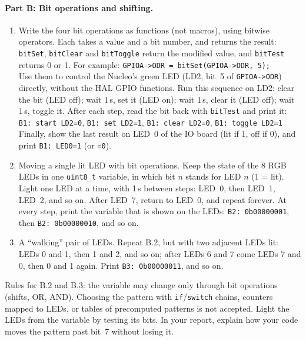 \documentclass[11pt,a4paper]{article}
\begin{document}
\paragraph{Part B: Bit operations and shifting.}
\begin{enumerate}[label=B.\arabic*, leftmargin=2.2em]
  \item Write the four bit operations as functions (not macros), using bitwise operators. Each takes a value and a bit
        number, and returns the result: \texttt{bitSet}, \texttt{bitClear} and \texttt{bitToggle} return the modified
        value, and \texttt{bitTest} returns 0 or 1. For example: \texttt{GPIOA->ODR = bitSet(GPIOA->ODR, 5);}\\
        Use them to control the Nucleo's green LED (LD2, bit~5 of \texttt{GPIOA->ODR}) directly, without the HAL GPIO
        functions. Run this sequence on LD2: clear the bit (LED off); wait 1\,s, set it (LED on); wait 1\,s, clear it
        (LED off); wait 1\,s, toggle it. After each step, read the bit back with \texttt{bitTest} and print it:\\
        \texttt{B1: start LD2=0}, \texttt{B1: set LD2=1}, \texttt{B1: clear LD2=0}, \texttt{B1: toggle LD2=1}\\
        Finally, show the last result on LED~0 of the IO board (lit if 1, off if 0), and print \texttt{B1: LED0=1}
        (or \texttt{=0}).
  \item Moving a single lit LED with bit operations. Keep the state of the 8 RGB LEDs in one \texttt{uint8\_t}
        variable, in which bit $n$ stands for LED $n$ (1 = lit). Light one LED at a time, with 1\,s between steps:
        LED~0, then LED~1, LED~2, and so on. After LED~7, return to LED~0, and repeat forever. At every step, print
        the variable that is shown on the LEDs: \texttt{B2: 0b00000001}, then \texttt{B2: 0b00000010}, and so on.
  \item A ``walking'' pair of LEDs. Repeat B.2, but with two adjacent LEDs lit: LEDs 0 and 1, then 1 and 2, and so
        on; after LEDs 6 and 7 come LEDs 7 and 0, then 0 and 1 again. Print \texttt{B3: 0b00000011}, and so on.
\end{enumerate}
\smallskip\noindent Rules for B.2 and B.3: the variable may change only through bit operations (shifts, OR, AND).
Choosing the pattern with \texttt{if}/\texttt{switch} chains, counters mapped to LEDs, or tables of precomputed
patterns is not accepted. Light the LEDs from the variable by testing its bits. In your report, explain how your code
moves the pattern past bit~7 without losing it.
\end{document}
